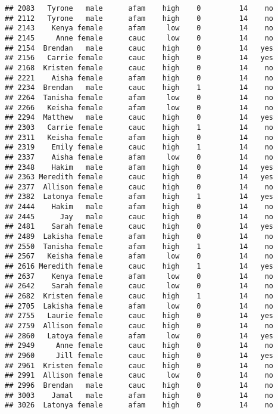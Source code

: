 \documentclass[
]{article}
\begin{document}
\begin{verbatim}
## 2083   Tyrone   male      afam    high    0         14    no
## 2112   Tyrone   male      afam    high    0         14    no
## 2143    Kenya female      afam     low    0         14    no
## 2145     Anne female      cauc     low    0         14    no
## 2154  Brendan   male      cauc    high    0         14   yes
## 2156   Carrie female      cauc    high    0         14   yes
## 2168  Kristen female      cauc    high    0         14    no
## 2221    Aisha female      afam    high    0         14    no
## 2234  Brendan   male      cauc    high    1         14    no
## 2264  Tanisha female      afam     low    0         14    no
## 2266   Keisha female      afam     low    0         14    no
## 2294  Matthew   male      cauc    high    0         14   yes
## 2303   Carrie female      cauc    high    1         14    no
## 2311   Keisha female      afam    high    0         14    no
## 2319    Emily female      cauc    high    1         14    no
## 2337    Aisha female      afam     low    0         14    no
## 2348    Hakim   male      afam    high    0         14   yes
## 2363 Meredith female      cauc    high    0         14   yes
## 2377  Allison female      cauc    high    0         14    no
## 2382  Latonya female      afam    high    1         14   yes
## 2444    Hakim   male      afam    high    0         14    no
## 2445      Jay   male      cauc    high    0         14    no
## 2481    Sarah female      cauc    high    0         14   yes
## 2489  Lakisha female      afam    high    0         14    no
## 2550  Tanisha female      afam    high    1         14    no
## 2567   Keisha female      afam     low    0         14    no
## 2616 Meredith female      cauc    high    1         14   yes
## 2637    Kenya female      afam     low    0         14    no
## 2642    Sarah female      cauc     low    0         14    no
## 2682  Kristen female      cauc    high    1         14    no
## 2705  Lakisha female      afam     low    0         14    no
## 2755   Laurie female      cauc    high    0         14   yes
## 2759  Allison female      cauc    high    0         14    no
## 2860   Latoya female      afam     low    0         14   yes
## 2949     Anne female      cauc    high    0         14    no
## 2960     Jill female      cauc    high    0         14   yes
## 2961  Kristen female      cauc    high    0         14    no
## 2991  Allison female      cauc     low    0         14    no
## 2996  Brendan   male      cauc    high    0         14    no
## 3003    Jamal   male      afam    high    0         14    no
## 3026  Latonya female      afam    high    0         14    no

\end{verbatim}
\end{document}
